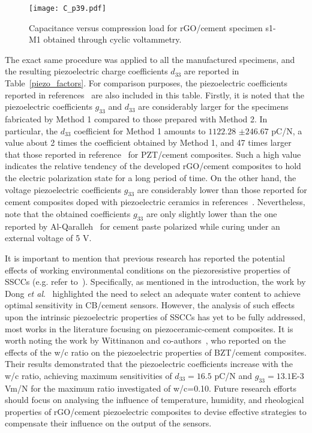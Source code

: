 \documentclass[a4paper,fleqn]{cas-sc}
\begin{document}
\begin{figure}[ht]
\centering
\texttt{[image: C\_p39.pdf]}
\caption{Capacitance versus compression load for rGO/cement specimen s1-M1 obtained through cyclic voltammetry.}
\label{C_p39}
\end{figure}

The exact same procedure was applied to all the manufactured specimens, and the resulting piezoelectric charge coefficients $d_{33}$ are reported in Table~\ref{piezo_factors}. For comparison purposes, the piezoelectric coefficients reported in references~\cite{AlQaralleh2022,Jaitanong2014, Gong2010} are also included in this table. Firstly, it is noted that the piezoelectric coefficients $g_{33}$ and $d_{33}$ are considerably larger for the specimens fabricated by Method 1 compared to those prepared with Method 2. In particular, the $d_{33}$ coefficient for Method 1 amounts to $1122.28$ $\pm246.67$ pC/N, a value about 2 times the coefficient obtained by Method 1, and 47 times larger that those reported in reference~\cite{Jaitanong2014} for PZT/cement composites. Such a high value indicates the relative tendency of the developed rGO/cement composites to hold the electric polarization state for a long period of time. On the other hand, the voltage piezoelectric coefficients $g_{33}$ are considerably lower than those reported for cement composites doped with piezoelectric ceramics in references~\cite{Jaitanong2014, Gong2010}. Nevertheless, note that the obtained coefficients $g_{33}$ are only slightly lower than the one reported by Al-Qaralleh~\cite{AlQaralleh2022} for cement paste polarized while curing under an external voltage of 5 V. 

It is important to mention that previous research has reported the potential effects of working environmental conditions on the piezoresistive properties of SSCCs (e.g. refer to~\cite{han2014self}). Specifically, as mentioned in the introduction, the work by Dong \textit{et al}.~\cite{DONG2019107488} highlighted the need to select an adequate water content to achieve optimal sensitivity in CB/cement sensors. However, the analysis of such effects upon the intrinsic piezoelectric properties of SSCCs has yet to be fully addressed, most works in the literature focusing on piezoceramic-cement composites. It is worth noting the work by Wittinanon and co-authors~\cite{wittinanon2023effect}, who reported on the effects of the w/c ratio on the piezoelectric properties of BZT/cement composites. Their results demonstrated that the piezoelectric coefficients increase with the w/c ratio, achieving maximum sensitivities of $d_{33}=16.5$ pC/N and $g_{33} = 13.1$E-3 Vm/N for the maximum ratio investigated of w/c=0.10. Future research efforts should focus on analysing the influence of temperature, humidity, and rheological properties of rGO/cement piezoelectric composites to devise effective strategies to compensate their influence on the output of the sensors. 
\end{document}
